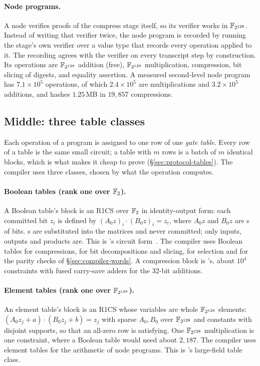 \paragraph{Node programs.} A node verifies proofs of the compress stage itself, so its verifier works in $\mathbb{F}_{2^{128}}$. Instead of writing that verifier twice, the node program is recorded by running the stage's own verifier over a value type that records every operation applied to it. The recording agrees with the verifier on every transcript step by construction. Its operations are $\mathbb{F}_{2^{128}}$ addition (free), $\mathbb{F}_{2^{128}}$ multiplication, \Blake{} compression, bit slicing of digests, and equality assertion. A measured second-level node program has $7.1\times 10^5$ operations, of which $2.4\times 10^5$ are multiplications and $3.2\times 10^5$ additions, and hashes $1.25$\,MB in $19{,}857$ compressions.

\subsection{Middle: three table classes}

Each operation of a program is assigned to one row of one \emph{gate table}. Every row of a table is the same small circuit; a table with $m$ rows is a batch of $m$ identical blocks, which is what makes it cheap to prove (\S\ref{sec:protocol-tables}). The compiler uses three classes, chosen by what the operation computes.

\paragraph{Boolean tables (rank one over $\mathbb{F}_{2}$).} A Boolean table's block is an R1CS over $\mathbb{F}_{2}$ in identity-output form: each committed bit $z_i$ is defined by $(A_0 z)_i \cdot (B_0 z)_i = z_i$, where $A_0 z$ and $B_0 z$ are \XOR{}s of bits. \XOR{}s are substituted into the matrices and never committed; only inputs, outputs and \AND{} products are. This is \Flock{}'s circuit form~\citep{flock}. The compiler uses Boolean tables for \Blake{} compressions, for bit decompositions and slicing, for selection and for the parity checks of \S\ref{sec:compiler-words}. A \Blake{} compression block is \Flock{}'s, about $10^4$ \AND{} constraints with fused carry-save adders for the 32-bit additions.

\paragraph{Element tables (rank one over $\mathbb{F}_{2^{128}}$).} An element table's block is an R1CS whose variables are whole $\mathbb{F}_{2^{128}}$ elements: $(A_0 z_j + a)\cdot(B_0 z_j + b) = z_j$ with sparse $A_0, B_0$ over $\mathbb{F}_{2^{128}}$ and constants with disjoint supports, so that an all-zero row is satisfying. One $\mathbb{F}_{2^{128}}$ multiplication is one constraint, where a Boolean table would need about $2{,}187$. The compiler uses element tables for the arithmetic of node programs. This is \Flock{}'s large-field table class.

